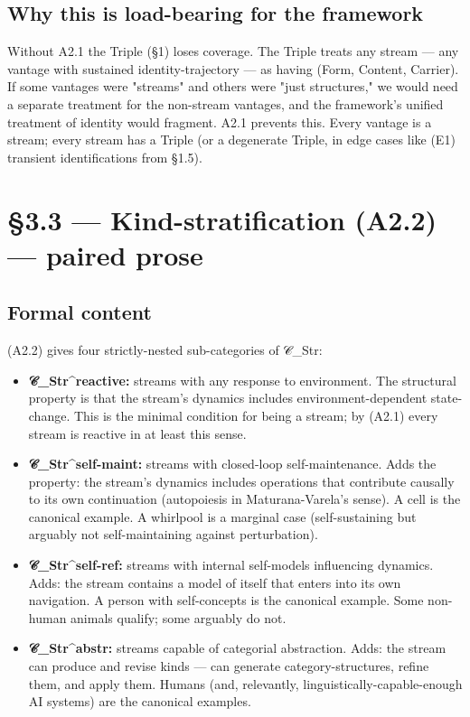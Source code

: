 \documentclass[11pt, openany]{book}
\newcommand{\sectionbreak}{\clearpage}
\begin{document}
\subsection{Why this is load-bearing for the framework}

Without A2.1 the Triple (§1) loses coverage. The Triple treats any stream --- any vantage with sustained identity-trajectory --- as having (Form, Content, Carrier). If some vantages were "streams" and others were "just structures," we would need a separate treatment for the non-stream vantages, and the framework's unified treatment of identity would fragment. A2.1 prevents this. Every vantage is a stream; every stream has a Triple (or a degenerate Triple, in edge cases like (E1) transient identifications from §1.5).

\sectionbreak

\section{§3.3 --- Kind-stratification (A2.2) --- paired prose}

\subsection{Formal content}

(A2.2) gives four strictly-nested sub-categories of 𝒞\_\allowbreak{}Str:

\begin{itemize}
\item \textbf{𝒞\_\allowbreak{}Str\textasciicircum{}reactive:} streams with any response to environment. The structural property is that the stream's dynamics includes environment-dependent state-change. This is the minimal condition for being a stream; by (A2.1) every stream is reactive in at least this sense.
\item \textbf{𝒞\_\allowbreak{}Str\textasciicircum{}self-maint:} streams with closed-loop self-maintenance. Adds the property: the stream's dynamics includes operations that contribute causally to its own continuation (autopoiesis in Maturana-Varela's sense). A cell is the canonical example. A whirlpool is a marginal case (self-sustaining but arguably not self-maintaining against perturbation).
\item \textbf{𝒞\_\allowbreak{}Str\textasciicircum{}self-ref:} streams with internal self-models influencing dynamics. Adds: the stream contains a model of itself that enters into its own navigation. A person with self-concepts is the canonical example. Some non-human animals qualify; some arguably do not.
\item \textbf{𝒞\_\allowbreak{}Str\textasciicircum{}abstr:} streams capable of categorial abstraction. Adds: the stream can produce and revise kinds --- can generate category-structures, refine them, and apply them. Humans (and, relevantly, linguistically-capable-enough AI systems) are the canonical examples.
\end{itemize}
\end{document}
